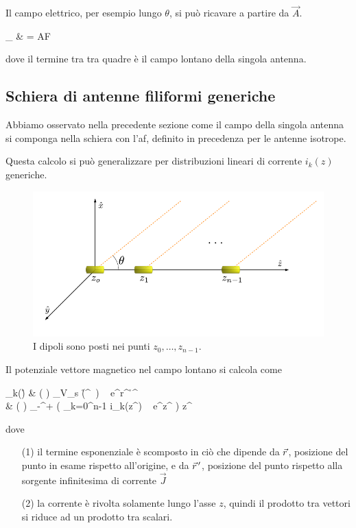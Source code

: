 		Il campo elettrico, per esempio lungo $\theta$, si può ricavare a partire da $\vec{A}$.
		\begin{esp}
			_\theta
			& =  AF
		\end{esp}
		dove il termine tra tra quadre è il campo lontano della singola antenna.

	\subsection{Schiera di antenne filiformi generiche}
		Abbiamo osservato nella precedente sezione come il campo della singola antenna si componga nella schiera con l'\gls{af}, definito in precedenza per le antenne isotrope.

		Questa calcolo si può generalizzare per distribuzioni lineari di corrente $i_k(z)$ generiche.

		\begin{figure}[ht]
			\centering
			\includegraphics{img/schiera_non_isotropa_dipoli.pdf}
			\caption{I dipoli sono posti nei punti $z_0, \ldots, z_{n-1}$.}
			\label{fig:schiera_non_isotropa_dipoli}
		\end{figure}

		Il potenziale vettore magnetico nel campo lontano si calcola come
		\begin{esp}
			\vec{A}_k(\r)
				&  \frac{\mu}{4\pi}
				\left( \frac{e^{-\jmath \beta r}}{r} \right)
				\int_{V_s} (\r^{\, \prime})
					~ e^{\jmath \beta r^\prime \cos \theta} \de \r^{\, \prime} \\
				&  \frac{\mu}{4\pi}
				\left(  \right) \hat{z}
				\int_{-\infty}^{+\infty}
					\left( \sum_{k=0}^{n-1} i_k(z^\prime) ~ e^{\jmath \beta z^\prime \cos \theta} \right)
					\de z^\prime
		\end{esp}
		dove
		\begin{itemize}
			\item[(1)] il termine esponenziale è scomposto in ciò che dipende da $\vec{r}$, posizione del punto in esame rispetto all'origine, e da $\vec{r}^{\,\prime}$, posizione del punto rispetto alla sorgente infinitesima di corrente $\vec{J}$
			\item[(2)] la corrente è rivolta solamente lungo l'asse $z$, quindi il prodotto tra vettori si riduce ad un prodotto tra scalari.
		\end{itemize}

